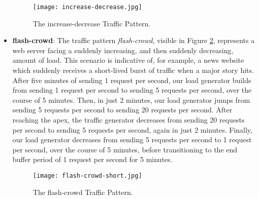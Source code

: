 \begin{itemize}
    \begin{figure}[!h]
      \centerline{\texttt{[image: increase-decrease.jpg]}}
      \caption{The increase-decrease Traffic Pattern.}
      \label{fig:increase-decrease}
    \end{figure}

  \item \textbf{flash-crowd}: The traffic pattern \textit{flash-crowd}, visible
    in Figure \ref{fig:flash-crowd}, represents a web server facing a suddenly
    increasing, and then suddenly decreasing, amount of load. This scenario is
    indicative of, for example, a news website which suddenly receives a
    short-lived burst of traffic when a major story hits. After five minutes of
    sending 1 request per second, our load generator
    builds from sending 1 request per second
    to sending 5 requests per second, over the course of 5 minutes. Then, in
    just 2 minutes, our load generator jumps from sending 5 requests per second
    to sending 20 requests per second. After reaching the apex, the traffic
    generator decreases from sending 20 requests per second to sending 5
    requests per second, again in just 2 minutes. Finally, our load generator
    decreases from sending 5 requests per second to 1 request per second, over
    the course of 5 minutes, before transitioning to the end buffer period of 1
    request per second for 5 minutes.

    \begin{figure}[!h]
      \centerline{\texttt{[image: flash-crowd-short.jpg]}}
      \caption{The flash-crowd Traffic Pattern.}
      \label{fig:flash-crowd}
    \end{figure}

\end{itemize}
